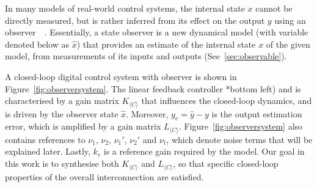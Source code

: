 \documentclass[sigconf]{llncs}
\newcommand{\mat}[1]{{#1}}
\renewcommand{\vec}[1]{{#1}}
\begin{document}
In many models of real-world control systems, 
the internal state $x$ cannot be directly measured,  
but is rather inferred from its effect on the output $\vec{y}$ using an observer~~\cite{Astrom08}.  
Essentially, a state observer is a new dynamical model (with variable denoted below as $\hat{\vec{x}}$) 
that provides an estimate of the internal state $x$ of the given model, 
from measurements of its inputs and outputs (See~\ref{sec:observable}). 

A closed-loop digital control system with observer is shown in Figure~\ref{fig:observersystem}. 
The linear feedback controller *bottom left) and is characterised by a gain matrix $\mat{K}_{\langle C \rangle}$ that influences the closed-loop dynamics, 
and is driven by the observer state $\hat{\vec{x}}$.  
Moreover, $\vec{y}_e=\hat{\vec{y}} - \vec{y}$ is the output estimation error,  
 which is amplified by a gain matrix $\mat{L}_{\langle C \rangle}$. 
Figure~\ref{fig:observersystem} also contains references to $\nu_1$, $\nu_2$, $\nu_1'$, $\nu_2'$ and $\nu_t$, which
  denote noise terms that will be explained later.   
  Lastly, $k_r$ is a reference gain required by the model.  
  Our goal in this work is to synthesise both $\mat{K}_{\langle C \rangle}$ and $\mat{L}_{\langle C \rangle}$, 
  so that specific closed-loop properties of the overall interconnection are satisfied.
 
\end{document}

